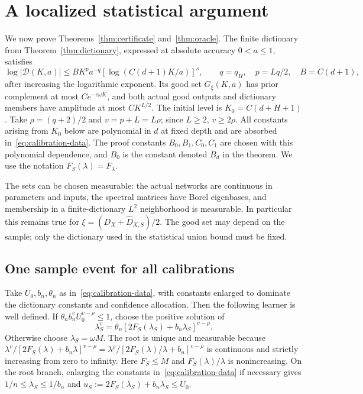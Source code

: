 \section{A localized statistical argument}
\label{sec:localized-direct-oracle}
We now prove Theorems~\ref{thm:certificate} and~\ref{thm:oracle}. The finite dictionary from Theorem~\ref{thm:dictionary}, expressed at absolute accuracy $0<a\le1$, satisfies
\[
 \log|\mathcal D(K,a)|
 \le B K^p a^{-q}\left[\log(C(d+1)K/a)\right]^s,\qquad
 q=q_H,\quad p=Lq/2,\quad B=C(d+1),
\]
after increasing the logarithmic exponent. Its good set $G_\xi(K,a)$ has prior complement at most $Ce^{-c\omega K}$, and both actual good outputs and dictionary members have amplitude at most $CK^{L/2}$. The initial level is $K_0=C(d+H+1)$.
Take $\rho=(q+2)/2$ and $v=p+L=L\rho$; since $L\ge2$, $v\ge2\rho$.
All constants arising from $K_0$ below are polynomial in $d$ at fixed depth and are absorbed in~\eqref{eq:calibration-data}. The proof constants $B_0,B_1,C_0,C_1$ are chosen with this polynomial dependence, and $B_0$ is the constant denoted $B_d$ in the theorem. We use the notation $F_S(\lambda)=F_\lambda$.

The sets can be chosen measurable: the actual networks are continuous in parameters and inputs, the spectral matrices have Borel eigenbases, and membership in a finite-dictionary $L^2$ neighborhood is measurable. In particular this remains true for $\xi=(D_X+\widehat D_{X,S})/2$. The good set may depend on the sample; only the dictionary used in the statistical union bound must be fixed.

\subsection{One sample event for all calibrations}
Take $U_0,b_n,\theta_n$ as in~\eqref{eq:calibration-data}, with constants enlarged to dominate the dictionary constants and confidence allocation. Then the following learner is well defined. If
$\theta_n b_n^v U_0^{v-\rho}\le1$, choose the positive solution of
\begin{equation}
 \lambda_S^v=\theta_n[2F_S(\lambda_S)+b_n\lambda_S]^{v-\rho}.
 \label{eq:localized-evidence-root}
\end{equation}
Otherwise choose $\lambda_S=\omega M$.
The root is unique and measurable because
$\lambda^v/[2F_S(\lambda)+b_n\lambda]^{v-\rho}
=\lambda^\rho/[2F_S(\lambda)/\lambda+b_n]^{v-\rho}$
is continuous and strictly increasing from zero to infinity.
Here $F_S\le M$ and $F_S(\lambda)/\lambda$ is nonincreasing.
On the root branch, enlarging the constants in~\eqref{eq:calibration-data} if necessary gives
$1/n\le\lambda_S\le1/b_n$ and
$u_S:=2F_S(\lambda_S)+b_n\lambda_S\le U_0$.

